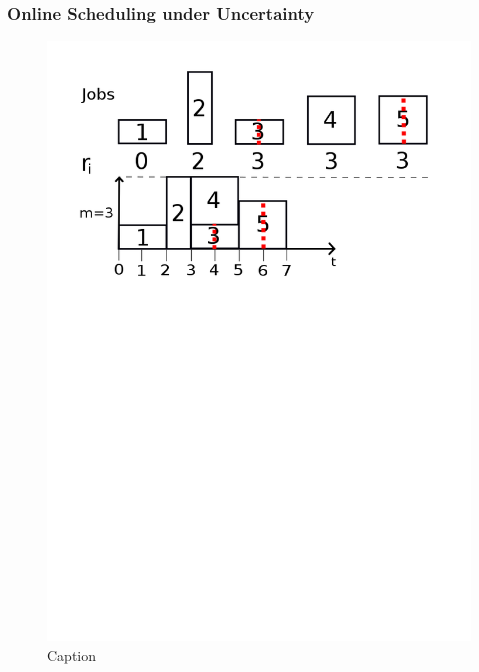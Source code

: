\documentclass{beamer}
\begin{document}
\begin{frame}
  \frametitle{Online Scheduling under Uncertainty}
  \begin{figure}[H]
          \centering
          \includegraphics[width=\textwidth]{uncertain2.png}
          \caption{Caption}
          \label{fig:online2_png}
  \end{figure}

\end{frame}
\end{document}

